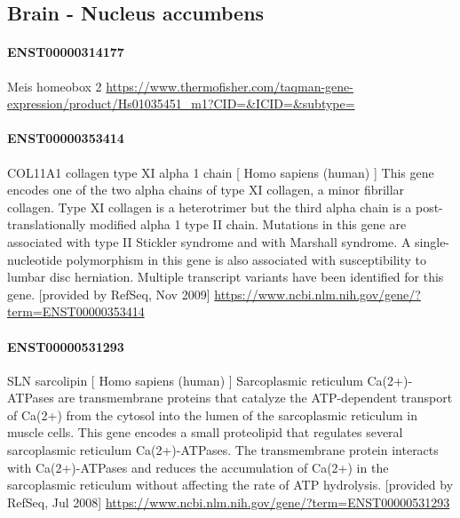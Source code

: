 \documentclass[
]{article}
\begin{document}
\hypertarget{brain---nucleus-accumbens}{%
\subsection{Brain - Nucleus accumbens}\label{brain---nucleus-accumbens}}

\hypertarget{enst00000314177}{%
\paragraph{ENST00000314177}\label{enst00000314177}}

Meis homeobox 2
\url{https://www.thermofisher.com/taqman-gene-expression/product/Hs01035451_m1?CID=\&ICID=\&subtype=}

\hypertarget{enst00000353414}{%
\paragraph{ENST00000353414}\label{enst00000353414}}

COL11A1 collagen type XI alpha 1 chain {[} Homo sapiens (human) {]} This
gene encodes one of the two alpha chains of type XI collagen, a minor
fibrillar collagen. Type XI collagen is a heterotrimer but the third
alpha chain is a post-translationally modified alpha 1 type II chain.
Mutations in this gene are associated with type II Stickler syndrome and
with Marshall syndrome. A single-nucleotide polymorphism in this gene is
also associated with susceptibility to lumbar disc herniation. Multiple
transcript variants have been identified for this gene. {[}provided by
RefSeq, Nov 2009{]}
\url{https://www.ncbi.nlm.nih.gov/gene/?term=ENST00000353414}

\hypertarget{enst00000531293}{%
\paragraph{ENST00000531293}\label{enst00000531293}}

SLN sarcolipin {[} Homo sapiens (human) {]} Sarcoplasmic reticulum
Ca(2+)-ATPases are transmembrane proteins that catalyze the
ATP-dependent transport of Ca(2+) from the cytosol into the lumen of the
sarcoplasmic reticulum in muscle cells. This gene encodes a small
proteolipid that regulates several sarcoplasmic reticulum
Ca(2+)-ATPases. The transmembrane protein interacts with Ca(2+)-ATPases
and reduces the accumulation of Ca(2+) in the sarcoplasmic reticulum
without affecting the rate of ATP hydrolysis. {[}provided by RefSeq, Jul
2008{]} \url{https://www.ncbi.nlm.nih.gov/gene/?term=ENST00000531293}
\end{document}
